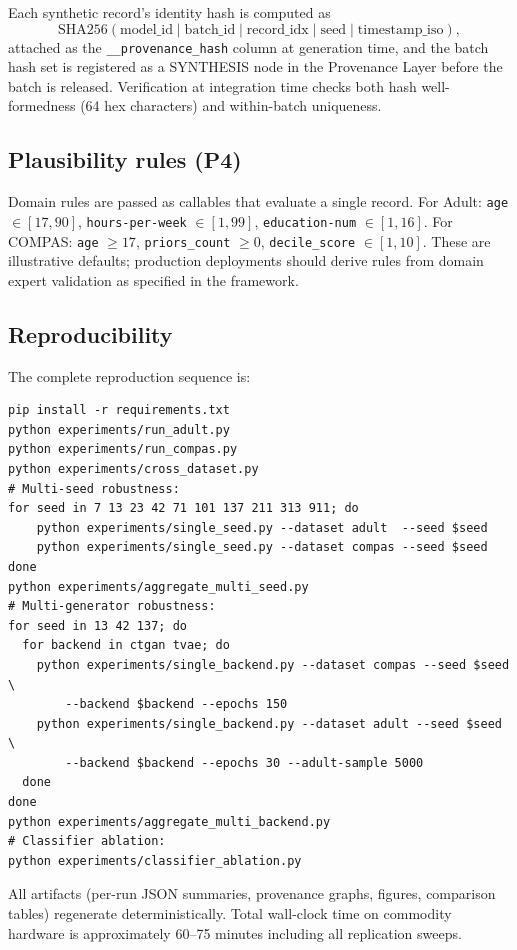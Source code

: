 \documentclass[11pt]{article}
\begin{document}
Each synthetic record's identity hash is computed as
\[
\mathrm{SHA256}(\text{model\_id} \mid \text{batch\_id} \mid \text{record\_idx} \mid \text{seed} \mid \text{timestamp\_iso}),
\]
attached as the \texttt{\_\_provenance\_hash} column at generation time, and the batch hash set is registered as a SYNTHESIS node in the Provenance Layer before the batch is released. Verification at integration time checks both hash well-formedness (64 hex characters) and within-batch uniqueness.

\subsection{Plausibility rules (P4)}

Domain rules are passed as callables that evaluate a single record. For Adult: \texttt{age} $\in [17, 90]$, \texttt{hours-per-week} $\in [1, 99]$, \texttt{education-num} $\in [1, 16]$. For COMPAS: \texttt{age} $\geq 17$, \texttt{priors\_count} $\geq 0$, \texttt{decile\_score} $\in [1, 10]$. These are illustrative defaults; production deployments should derive rules from domain expert validation as specified in the framework.

\subsection{Reproducibility}

The complete reproduction sequence is:

\begin{verbatim}
pip install -r requirements.txt
python experiments/run_adult.py
python experiments/run_compas.py
python experiments/cross_dataset.py
# Multi-seed robustness:
for seed in 7 13 23 42 71 101 137 211 313 911; do
    python experiments/single_seed.py --dataset adult  --seed $seed
    python experiments/single_seed.py --dataset compas --seed $seed
done
python experiments/aggregate_multi_seed.py
# Multi-generator robustness:
for seed in 13 42 137; do
  for backend in ctgan tvae; do
    python experiments/single_backend.py --dataset compas --seed $seed \
        --backend $backend --epochs 150
    python experiments/single_backend.py --dataset adult --seed $seed \
        --backend $backend --epochs 30 --adult-sample 5000
  done
done
python experiments/aggregate_multi_backend.py
# Classifier ablation:
python experiments/classifier_ablation.py
\end{verbatim}

All artifacts (per-run JSON summaries, provenance graphs, figures, comparison tables) regenerate deterministically. Total wall-clock time on commodity hardware is approximately 60--75 minutes including all replication sweeps.
\end{document}

